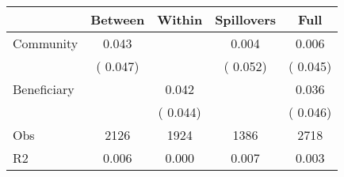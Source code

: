
\begin{tabular}{l*{4}{c}}\hline&\multicolumn{1}{c}{Between}&\multicolumn{1}{c}{Within}&\multicolumn{1}{c}{Spillovers}&\multicolumn{1}{c}{Full}\\ \hline
 Community             &              0.043      &                                               &        0.004 &         0.006                            \\ 
                               &        (       0.047)           &                                       &       (       0.052)     &      (       0.045)                                           \\ 
 Beneficiary   &                                               &        0.042    &                                &             0.036                            \\ 
                               &                                               & (       0.044)                  &                                        &      (       0.046)                                           \\ 
\hline                                                                                                                                                                                                                                            
 Obs                   &               2126               &       1924                       &       1386                &              2718                                               \\ 
 R2                    &                      0.006              &              0.000                      &              0.007               &                     0.003                                              \\ 
\hline \end{tabular}                                                                                                                                                                                                              